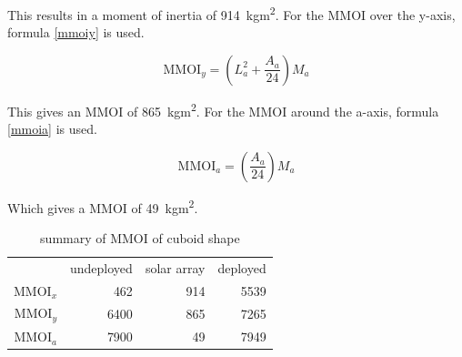This results in a moment of inertia of \SI{914}{kgm^2}.  For the MMOI
over the y-axis, formula \ref{mmoiy} is used.

\begin{equation}
  \label{mmoiy}
  \mathrm{MMOI}_y=\left(L_a^2+\frac{A_a}{24}\right)M_a
\end{equation}

This gives an MMOI of \SI{865}{kgm^2}.  For the MMOI around the
a-axis, formula \ref{mmoia} is used.

\begin{equation}
  \label{mmoia}
  \mathrm{MMOI}_a=\left(\frac{A_a}{24}\right)M_a
\end{equation}

Which gives a MMOI of \SI{49}{kgm^2}.

\begin{longtable}{rrrr}
\caption{summary of MMOI of cuboid shape} \\
 & undeployed & solar array & deployed \\
 MMOI$_x$ & 462 & 914 & 5539 \\
 MMOI$_y$ & 6400 & 865 & 7265 \\
 MMOI$_a$ & 7900 & 49 & 7949 \\
\end{longtable}
